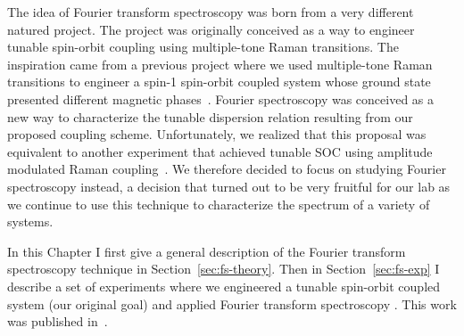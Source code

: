 The idea of Fourier transform spectroscopy was born from a very different natured project. The project was originally conceived as a way to engineer tunable spin-orbit coupling using multiple-tone Raman transitions. The inspiration came from a previous project where we used multiple-tone Raman transitions to engineer a spin-1 spin-orbit coupled system whose ground state presented different magnetic phases~\cite{campbell_magnetic_2016}. Fourier spectroscopy was conceived as a new way to characterize the tunable dispersion relation resulting from our proposed coupling scheme. Unfortunately, we realized that this proposal was equivalent to another experiment that achieved tunable SOC using amplitude modulated Raman coupling~\cite{jimenez-garcia_tunable_2015}. We therefore decided to focus on studying Fourier spectroscopy instead, a decision that turned out to be very fruitful for our lab as we continue to use this technique to characterize the spectrum of a variety of systems. 

In this Chapter I first give a general description of the Fourier transform spectroscopy technique in Section~\ref{sec:fs-theory}. Then in Section~\ref{sec:fs-exp} I describe a set of experiments where we engineered a tunable spin-orbit coupled system (our original goal) and applied Fourier transform spectroscopy . This work was published in~\cite{valdes-curiel_fourier_2017}.


